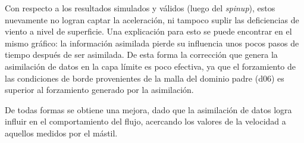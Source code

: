 Con respecto a los resultados simulados y válidos (luego del \emph{spinup}), estos nuevamente no logran captar la aceleración, ni tampoco suplir las deficiencias de viento a nivel de superficie. Una explicación para esto se puede encontrar en el mismo gráfico: la información asimilada pierde su influencia unos pocos pasos de tiempo después de ser asimilada. De esta forma la corrección que genera la asimilación de datos en la capa límite es poco efectiva, ya que el forzamiento de las condiciones de borde provenientes de la malla del dominio padre (d06) es superior al forzamiento generado por la asimilación.

De todas formas se obtiene una mejora, dado que la asimilación de datos logra influir en el comportamiento del flujo, acercando los valores de la velocidad a aquellos medidos por el mástil.

